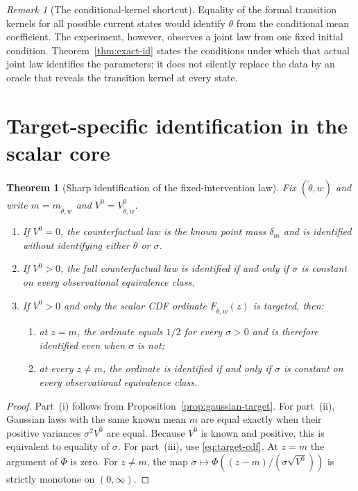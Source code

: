 \documentclass[11pt]{article}
\newtheorem{theorem}[assumption]{Theorem}
\theoremstyle{remark}
\newtheorem{remark}[assumption]{Remark}
\newcommand{\PhiN}{\Phi}
\newcommand{\1}{\mathbf 1}
\begin{document}
\begin{remark}[The conditional-kernel shortcut]
Equality of the formal transition kernels for all possible current states would identify $\theta$ from the conditional mean coefficient.  The experiment, however, observes a joint law from one fixed initial condition.  Theorem~\ref{thm:exact-id} states the conditions under which that actual joint law identifies the parameters; it does not silently replace the data by an oracle that reveals the transition kernel at every state.
\end{remark}

\section{Target-specific identification in the scalar core}

\begin{theorem}[Sharp identification of the fixed-intervention law]\label{thm:target-specific}
Fix $(\widetilde\theta,w)$ and write $m=m_{\widetilde\theta,w}$ and $V^0=V_{\widetilde\theta,w}^0$.

\begin{enumerate}[label=\textup{(\roman*)},leftmargin=2.6em]
\item If $V^0=0$, the counterfactual law is the known point mass $\delta_m$ and is identified without identifying either $\theta$ or $\sigma$.

\item If $V^0>0$, the full counterfactual law is identified if and only if $\sigma$ is constant on every observational equivalence class.

\item If $V^0>0$ and only the scalar CDF ordinate $F_{\widetilde\theta,w}(z)$ is targeted, then:
\begin{enumerate}[label=\textup{(\alph*)},leftmargin=2.4em]
\item at $z=m$, the ordinate equals $1/2$ for every $\sigma>0$ and is therefore identified even when $\sigma$ is not;
\item at every $z\ne m$, the ordinate is identified if and only if $\sigma$ is constant on every observational equivalence class.
\end{enumerate}
\end{enumerate}
\end{theorem}

\begin{proof}
Part~(i) follows from Proposition~\ref{prop:gaussian-target}.  For part~(ii), Gaussian laws with the same known mean $m$ are equal exactly when their positive variances $\sigma^2V^0$ are equal.  Because $V^0$ is known and positive, this is equivalent to equality of $\sigma$.  For part~(iii), use \eqref{eq:target-cdf}.  At $z=m$ the argument of $\PhiN$ is zero.  For $z\ne m$, the map $\sigma\mapsto\PhiN((z-m)/(\sigma\sqrt{V^0}))$ is strictly monotone on $(0,\infty)$.
\end{proof}
\end{document}

